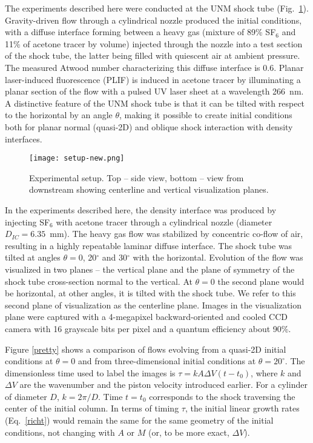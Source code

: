 \documentclass[preprint,superscriptaddress,showpacs]{revtex4-1}
\begin{document}
The experiments described here were conducted at the UNM shock tube \cite{prl,anderson12} 
(Fig.~\ref{setup}). Gravity-driven flow through a cylindrical nozzle produced the initial conditions, with a diffuse interface forming between a heavy gas (mixture of 89\% SF$_6$ and 11\% of acetone tracer by volume) injected through the nozzle into a test section of the shock tube, 
the latter being filled with quiescent air at ambient pressure. The measured  
Atwood number characterizing this diffuse interface is 0.6.
Planar laser-induced fluorescence (PLIF) is induced in acetone tracer by illuminating a 
planar section of the flow with a pulsed UV laser sheet at a wavelength 266~nm. 
A distinctive feature of the UNM shock tube is that it can be tilted with
respect to the horizontal by an angle $\theta$, making it possible to create initial conditions
both for planar normal (quasi-2D) and oblique shock interaction with density interfaces. 

\begin{figure}
\centerline{\texttt{[image: setup-new.png]}}
\caption{\label{setup} Experimental setup. Top -- side view, bottom -- view from downstream showing centerline and vertical visualization planes.}
\end{figure}

In the experiments described here, the density interface was produced by injecting SF$_6$ with
acetone tracer through a cylindrical nozzle (diameter $D_{IC}=6.35$~mm). The heavy gas flow was stabilized by concentric co-flow of air, resulting in a highly repeatable laminar diffuse interface. The shock tube was tilted at angles $\theta = 0$, 20$^\circ$ and 30$^\circ$ with
the horizontal. Evolution of the flow was visualized in two planes -- the vertical plane and the
plane of symmetry of the shock tube cross-section normal to the vertical. At $\theta = 0$ the
second plane would be horizontal, at other angles, it is tilted with the shock tube. We refer to this second plane of visualization as the centerline plane. Images in the visualization plane were captured with 
a 4-megapixel backward-oriented and cooled CCD camera with 16 grayscale bits per pixel and a quantum
efficiency about 90\%.

Figure \ref{pretty} shows a comparison of flows evolving from a quasi-2D initial conditions 
at $\theta=0$ and from three-dimensional initial conditions at $\theta=20^\circ$. The dimensionless time used to label the images is $\tau=k A\Delta V(t-t_0)$, where $k$ and 
$\Delta V$ are the wavenumber and the piston velocity introduced earlier. For a cylinder of diameter $D$, $k= 2\pi / D$. Time $t = t_0$ corresponds to the shock traversing the center of the initial column. 
In terms of timing $\tau$, the initial linear growth rates (Eq.~\ref{richt}) would remain the same 
for the same geometry of the initial conditions, not changing with  $A$  or $M$ 
(or, to be more exact, $\Delta V$).  
\end{document}
